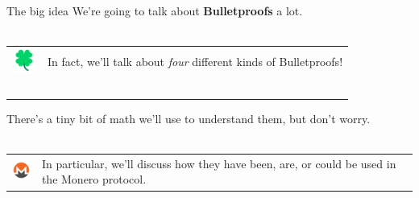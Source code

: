 \documentclass[aspectratio=169]{beamer}
\begin{document}
\begin{frame}{The big idea}
    We're going to talk about \textbf{Bulletproofs} a lot. \\~\\

    \begin{tabular}{>{\arraybackslash}m{40px} >{\arraybackslash}m{320px}}
        \includegraphics[width=30px]{images/four.png} & In fact, we'll talk about \textit{four} different kinds of Bulletproofs! \\~\\
    \end{tabular}

    There's a tiny bit of math we'll use to understand them, but don't worry. \\~\\

    \begin{tabular}{>{\arraybackslash}m{40px} >{\arraybackslash}m{320px}}
        \includegraphics[width=30px]{images/monero.png} & In particular, we'll discuss how they have been, are, or could be used in the Monero protocol.
    \end{tabular}
\end{frame}
\end{document}
